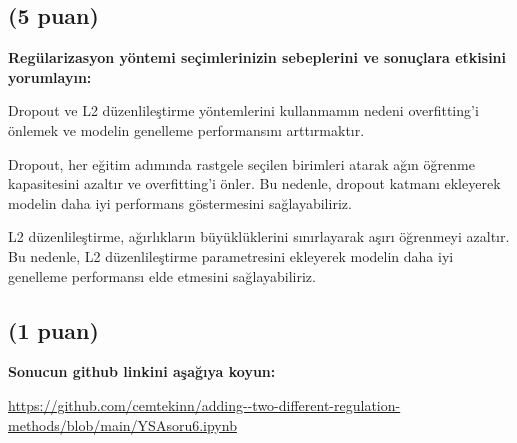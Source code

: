 \documentclass[11pt]{article}
\begin{document}
\subsection{(5 puan)} \textbf{Regülarizasyon yöntemi seçimlerinizin sebeplerini ve sonuçlara etkisini yorumlayın:}

Dropout ve L2 düzenlileştirme yöntemlerini kullanmamın nedeni overfitting'i önlemek ve modelin genelleme performansını arttırmaktır.

Dropout, her eğitim adımında rastgele seçilen birimleri atarak ağın öğrenme kapasitesini azaltır ve overfitting'i önler. Bu nedenle, dropout katmanı ekleyerek modelin daha iyi performans göstermesini sağlayabiliriz.

L2 düzenlileştirme, ağırlıkların büyüklüklerini sınırlayarak aşırı öğrenmeyi azaltır. Bu nedenle, L2 düzenlileştirme parametresini ekleyerek modelin daha iyi genelleme performansı elde etmesini sağlayabiliriz.

\subsection{(1 puan)} \textbf{Sonucun github linkini  aşağıya koyun:}

\url{https://github.com/cemtekinn/adding--two-different-regulation-methods/blob/main/YSAsoru6.ipynb}
\end{document}
